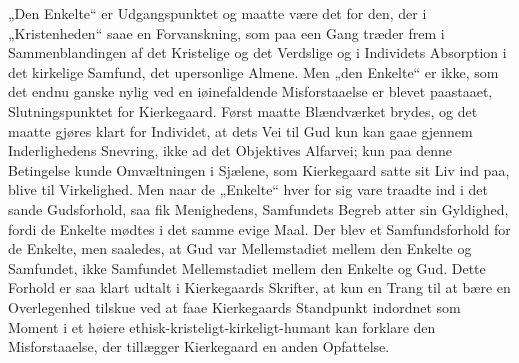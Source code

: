 \documentclass[12pt,a4paper,openany]{book}
\newcommand{\opage}[1]{\marginnote{\footnotesize\textit{[#1]}}}
\begin{document}
„Den Enkelte“ er Udgangspunktet og maatte være det
for den, der i „Kristenheden“ saae en Forvanskning, som paa
een Gang træder frem i Sammenblandingen af det Kristelige
og det Verdslige og i Individets Absorption i det kirkelige
Samfund, det upersonlige Almene. Men „den Enkelte“ er
ikke, som det endnu ganske nylig ved en iøinefaldende Misforstaaelse
er blevet paastaaet, Slutningspunktet for Kierkegaard.
Først maatte Blændværket brydes, og det maatte
gjøres klart for Individet, at dets Vei til Gud kun kan
gaae gjennem Inderlighedens Snevring, ikke ad det Objektives
Alfarvei; kun paa denne Betingelse kunde Omvæltningen
i Sjælene, som Kierkegaard satte sit Liv ind paa, blive til
Virkelighed. Men naar de „Enkelte“ hver for sig vare
traadte ind i det sande Gudsforhold, saa fik Menighedens,
Samfundets Begreb atter sin Gyldighed, fordi de Enkelte
mødtes i det samme evige Maal. Der blev et Samfundsforhold
for de Enkelte, men saaledes, at Gud var Mellemstadiet
mellem den Enkelte og Samfundet, ikke Samfundet
\opage{436}Mellemstadiet mellem den Enkelte og Gud. Dette Forhold
er saa klart udtalt i Kierkegaards Skrifter, at kun en Trang
til at bære en Overlegenhed tilskue ved at faae Kierkegaards
Standpunkt indordnet som Moment i et høiere ethisk-kristeligt-kirkeligt-humant
kan forklare den Misforstaaelse, der tillægger
Kierkegaard en anden Opfattelse.
\end{document}
